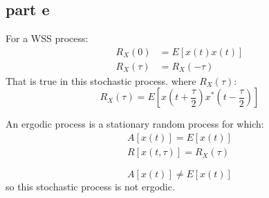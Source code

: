 \subsection{part e}
For a WSS process:
\begin{align*}
    R_X(0) &= E[x(t)x(t)]\\
    R_X(\tau) &= R_X(-\tau)
\end{align*}
That is true in this stochastic process.
where $R_X(\tau)$:
$$
R_X(\tau) = E\left[x(t+\dfrac{\tau}{2})x^*(t-\dfrac{\tau}{2})\right]
$$


An ergodic process is a stationary random process for which:
\begin{align*}
    A[x(t)] = E[x(t)]\\
    R[x(t, \tau)] = R_X(\tau)
\end{align*}

$$
A[x(t)] \not= E[x(t)]
$$
so this stochastic process is not ergodic.